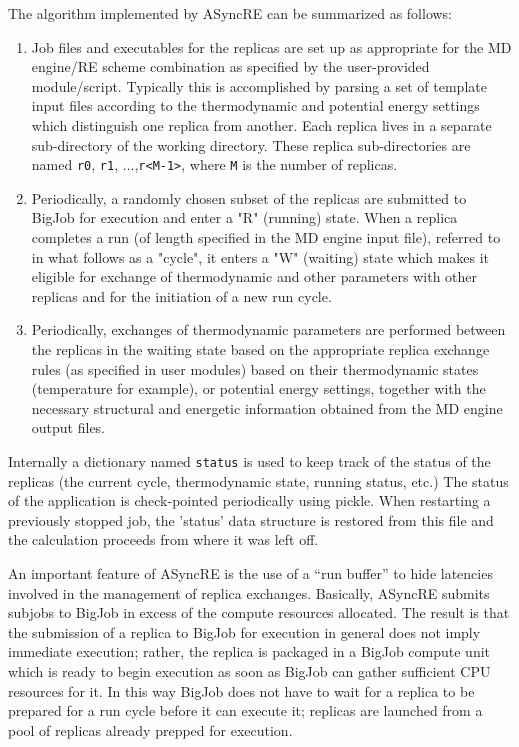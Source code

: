 \documentclass{sig-alternate}
\begin{document}
The algorithm implemented by ASyncRE can be summarized as follows:

\begin{enumerate}

\item Job files and executables for the replicas are set up as
  appropriate for the MD engine/RE scheme combination as specified by
  the user-provided module/script. Typically this is accomplished by parsing a
  set of template input files according to the thermodynamic and
  potential energy settings which distinguish one replica from
  another. Each replica lives in a separate sub-directory of the
  working directory. These replica sub-directories are named
  \verb+r0+, {\tt r1}, $\ldots$,\verb+r<M-1>+, where \verb+M+ is the
  number of replicas.

\item Periodically, a randomly chosen subset of the replicas are
  submitted to BigJob for execution and enter a "R" (running)
  state. When a replica completes a run (of length specified in the MD
  engine input file), referred to in what follows as a "cycle", it
  enters a "W" (waiting) state which makes it eligible for exchange of
  thermodynamic and other parameters with other replicas and for the
  initiation of a new run cycle.

\item Periodically, exchanges of thermodynamic parameters are
  performed between the replicas in the waiting state based on the
  appropriate replica exchange rules (as specified in user modules)
  based on their thermodynamic states (temperature for example), or
  potential energy settings, together with the necessary structural
  and energetic information obtained from the MD engine output files.

\end{enumerate}

Internally a dictionary named \verb+status+ is used to keep track of
the status of the replicas (the current cycle, thermodynamic state,
running status, etc.) The status of the application is check-pointed
periodically using pickle. When restarting a previously stopped job,
the 'status' data structure is restored from this file and the
calculation proceeds from where it was left off.

An important feature of ASyncRE is the use of a ``run buffer'' to hide
latencies involved in the management of replica exchanges. Basically,
ASyncRE submits subjobs to BigJob in excess of the compute resources
allocated.  The result is that the submission of a replica
to BigJob for execution in general does not imply immediate execution;
rather, the replica is packaged in a BigJob compute unit which is
ready to begin execution as soon as BigJob can gather sufficient CPU
resources for it. In this way BigJob does not have to wait for a
replica to be prepared for a run cycle before it can execute it;
replicas are launched from a pool of replicas already prepped for
execution.
\end{document}

